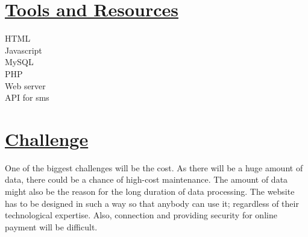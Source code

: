 \documentclass{article}
\begin{document}
\section*{\underline{Tools and Resources}}

HTML\\
Javascript\\
MySQL\\
PHP\\
Web server\\
API for sms

\section*{\underline{Challenge}}

One of the biggest challenges will be the cost. As there will be a huge amount of data, there could be a chance of high-cost maintenance. The amount of data might also be the reason for the long duration of data processing. The website has to be designed in such a way so that anybody can use it; regardless of their technological expertise. Also, connection and providing security for online payment will be difficult.
\end{document}
